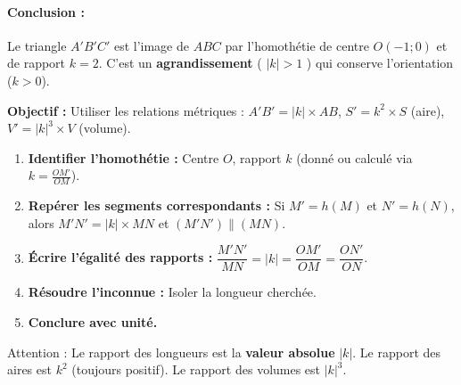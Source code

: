 \documentclass[11pt]{article}
\newcommand{\cle}[1]{{\popxbold\color{popdark}#1}}
\begin{document}
\begin{exoresolu}
\paragraph{Conclusion :} Le triangle $A'B'C'$ est l'image de $ABC$ par l'homothétie de centre $O(-1;0)$ et de rapport $k=2$. C'est un \textbf{agrandissement} ( $|k|>1$ ) qui conserve l'orientation ($k>0$).
\end{exoresolu}

\begin{methode}
\textbf{Objectif :} Utiliser les relations métriques : $A'B' = |k| \times AB$, $S' = k^2 \times S$ (aire), $V' = |k|^3 \times V$ (volume).
\begin{enumerate}
    \item \textbf{Identifier l'homothétie :} Centre $O$, rapport $k$ (donné ou calculé via $k = \frac{OM'}{OM}$).
    \item \textbf{Repérer les segments correspondants :} Si $M' = h(M)$ et $N' = h(N)$, alors $M'N' = |k| \times MN$ et $(M'N') \parallel (MN)$.
    \item \textbf{Écrire l'égalité des rapports :} $\dfrac{M'N'}{MN} = |k| = \dfrac{OM'}{OM} = \dfrac{ON'}{ON}$.
    \item \textbf{Résoudre l'inconnue :} Isoler la longueur cherchée.
    \item \textbf{Conclure avec unité.}
\end{enumerate}
\cle{Attention} : Le rapport des longueurs est la \textbf{valeur absolue} $|k|$. Le rapport des aires est $k^2$ (toujours positif). Le rapport des volumes est $|k|^3$.
\end{methode}
\end{document}
